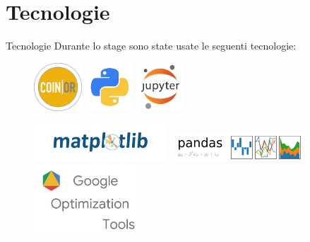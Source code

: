 \documentclass{beamer}
\begin{document}
\section{Tecnologie}
\begin{frame}{Tecnologie}
	Durante lo stage sono state usate le seguenti tecnologie:
									
	\vspace{.5em}
	\begin{minipage}[c]{0.2\textwidth}
		\begin{figure}
			\centering
			\includegraphics[width=1.8cm]{figures/coin_banner}
			\vspace{.5em}
			\includegraphics[width=1.8cm]{figures/python}
			\vspace{.5em}
			\includegraphics[width=1.8cm]{figures/jupyter}
		\end{figure}
	\end{minipage}
	\hfill
	\begin{minipage}[c]{0.6\textwidth}
		\begin{figure}
			\centering
			\includegraphics[width=5cm]{figures/matplotlib-1}
			\vspace{.5em}
			\includegraphics[width=5cm]{figures/pandas_logo}
			\vspace{.5em}
			\includegraphics[width=4cm]{figures/google_or_tools}
		\end{figure}
	\end{minipage}		
\end{frame}
\end{document}
